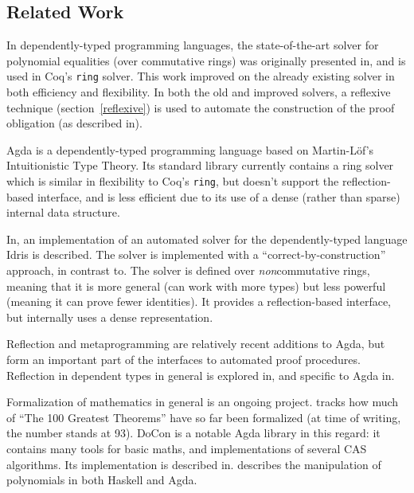 \documentclass[draft, twocolumn]{article}
\theoremstyle{definition}
\theoremstyle{definition}
\begin{document}
\subsection{Related Work} 
In dependently-typed programming languages, the state-of-the-art solver for
polynomial equalities (over commutative rings) was originally presented
in\cite{gregoire_proving_2005}, and is used in Coq's \verb+ring+ solver. This
work improved on the already existing solver\cite{Coq:manual} in both efficiency
and flexibility. In both the old and improved solvers, a reflexive technique
(section~\ref{reflexive}) is used to automate the construction of the proof
obligation (as described in\cite{boutin_using_1997}).

Agda\cite{norell_dependently_2008} is a dependently-typed programming language
based on Martin-Löf's Intuitionistic Type
Theory\cite{martin-lof_intuitionistic_1980}. Its standard
library\cite{danielsson_agda_2018} currently contains a ring solver which is
similar in flexibility to Coq's \verb+ring+, but doesn't support the
reflection-based interface, and is less efficient due to its use of a dense
(rather than sparse) internal data structure.

In\cite{geuvers_automatically_2017}, an implementation of an automated solver
for the dependently-typed language Idris\cite{brady_idris_2013} is described.
The solver is implemented with a ``correct-by-construction'' approach, in
contrast to\cite{gregoire_proving_2005}. The solver is defined over
\emph{non}commutative rings, meaning that it is more general (can work with more
types) but less powerful (meaning it can prove fewer identities). It provides a
reflection-based interface, but internally uses a dense representation.

Reflection and metaprogramming are relatively recent additions to Agda, but form
an important part of the interfaces to automated proof procedures. Reflection in
dependent types in general is explored in\cite{christiansen_practical_2015}, and
specific to Agda in\cite{van_der_walt_reflection_2012}.

Formalization of mathematics in general is an ongoing project.
\cite{wiedijk_formalizing_2018} tracks how much of ``The 100 Greatest Theorems''
\cite{kahl_hundred_2004} have so far been formalized (at time of writing, the
number stands at 93). DoCon\cite{meshveliani_docon-provable_2018} is a notable
Agda library in this regard: it contains many tools for basic maths, and
implementations of several CAS algorithms. Its implementation is described
in\cite{meshveliani_dependent_2013}. \cite{cheng_functional_2018} describes the
manipulation of polynomials in both Haskell and Agda.
\end{document}
